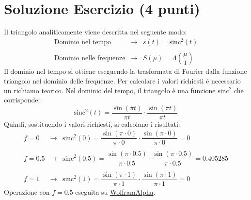 \documentclass[a4paper]{article}
\begin{document}
	\section{Soluzione Esercizio (4 punti)}
	
	Il triangolo analiticamente viene descritta nel seguente modo:
	\begin{equation*}
		\begin{array}{lll}
			\text{Dominio nel tempo} & \longrightarrow & s\left(t\right) = \mathrm{sinc}^{2}\left(t\right) \\
			\\
			\text{Dominio nelle frequenze} & \longrightarrow & S\left(\mu\right) = \Lambda\left(\dfrac{\mu}{1}\right)
		\end{array}
	\end{equation*}
	Il dominio nel tempo si ottiene eseguendo la trasformata di Fourier dalla funzione triangolo nel dominio delle frequenze. Per calcolare i valori richiesti è necessario un richiamo teorico. Nel dominio del tempo, il triangolo è una funzione $\mathrm{sinc}^{2}$ che corrisponde:
	\begin{equation*}
		\mathrm{sinc}^{2}\left(t\right) = \dfrac{\sin\left(\pi t\right)}{\pi t} \cdot \dfrac{\sin\left(\pi t\right)}{\pi t}
	\end{equation*}
	Quindi, sostituendo i valori richiesti, si calcolano i risultati:
	\begin{equation*}
		\begin{array}{lll}
			f = 0 & \longrightarrow & \mathrm{sinc}^{2}\left(0\right) = \dfrac{\sin\left(\pi \cdot 0\right)}{\pi \cdot 0} \cdot \dfrac{\sin\left(\pi \cdot 0\right)}{\pi \cdot 0} = 0 \\
			\\
			f = 0.5 & \longrightarrow & \mathrm{sinc}^{2}\left(0.5\right) = \dfrac{\sin\left(\pi \cdot 0.5\right)}{\pi \cdot 0.5} \cdot \dfrac{\sin\left(\pi \cdot 0.5\right)}{\pi \cdot 0.5} = 0.405285 \\
			\\
			f = 1 & \longrightarrow & \mathrm{sinc}^{2}\left(1\right) = \dfrac{\sin\left(\pi \cdot 1\right)}{\pi \cdot 1} \cdot \dfrac{\sin\left(\pi \cdot 1\right)}{\pi \cdot 1} = 0
		\end{array} 
	\end{equation*}
	Operazione con $f=0.5$ eseguita su \href{https://www.wolframalpha.com/input?i=%7Bsinc%7D%5E%7B2%7D%3D+%5Cdfrac%7B%5Csin%5Cleft%28%5Cpi+%5Ccdot+0.5%5Cright%29%7D%7B%5Cpi+%5Ccdot+0.5%7D+%5Ccdot+%5Cdfrac%7B%5Csin%5Cleft%28%5Cpi+%5Ccdot+0.5%5Cright%29%7D%7B%5Cpi+%5Ccdot+0.5%7D}{WolframAlpha}.\newpage
	
\end{document}
